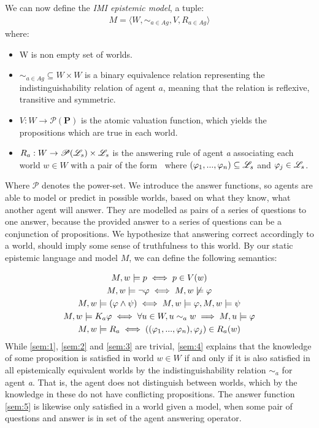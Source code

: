 We can now define the \textit{IMI epistemic model}, a tuple:
\begin{align}
    M = \langle W, \sim_{a\in Ag}, V, R_{a\in Ag}\rangle \label{eq:3}
\end{align}
where:
\begin{itemize}
    \setlength\itemsep{-0.4em}
    \item W is non empty set of worlds.
    \item $\sim_{a\in Ag} \subseteq W \times W$ is a binary equivalence relation representing the indistinguishability relation of agent $a$, meaning that the relation is reflexive, transitive and symmetric.
    \item $V : W \rightarrow \mathscr{P}(\mathbf{P})$ is the atomic valuation function, which yields the propositions which are true in each world.
    \item $R_a : W \rightarrow \mathscr{P}(\mathscr{L}_s) \times \mathscr{L}_s$ is the answering rule of agent \textit{a} associating each world $w \in W$ with a pair of the form \aset $\:$ where $(\varphi_1,...,\varphi_n) \subseteq \mathscr{L}_s$ and $\varphi_j \in \mathscr{L}_s$.
\end{itemize}
Where $\mathscr{P}$ denotes the power-set. We introduce the answer functions, so agents are able to model or predict in possible worlds, based on what they know, what another agent will answer. They are modelled as pairs of a series of questions to one answer, because the provided answer to a series of questions can be a conjunction of propositions. We hypothesize that answering correct accordingly to a world, should imply some sense of truthfulness to this world. By our static epistemic language \staticlang\: and model $M$, we can define the following semantics:

\begin{gather}
    M, w |= p \iff p \in V(w) \label{sem:1}\\
    M, w |= \neg\varphi \iff M, w \not\models \varphi \label{sem:2}\\
    M, w |= (\varphi \land \psi) \iff M, w |= \varphi, M, w |= \psi \label{sem:3}\\
    M, w |= K_a\varphi \iff \forall u\in W, u \sim_{a} w \implies M, u |= \varphi \label{sem:4}\\
    M, w |= R_a \iff ((\varphi_1,...,\varphi_n), \varphi_j) \in R_a(w) \label{sem:5}
\end{gather}
While \cref{sem:1}, \cref{sem:2} and \cref{sem:3} are trivial, \cref{sem:4} explains that the knowledge of some proposition \proposition is satisfied in world $w \in W$ if and only if it is also satisfied in all epistemically equivalent worlds by the indistinguishability relation $\sim_a$ for agent \textit{a}. That is, the agent does not distinguish between worlds, which by the knowledge in these do not have conflicting propositions. The answer function \cref{sem:5} is likewise only satisfied in a world given a model, when some pair of questions and answer is in set of the agent answering operator.

